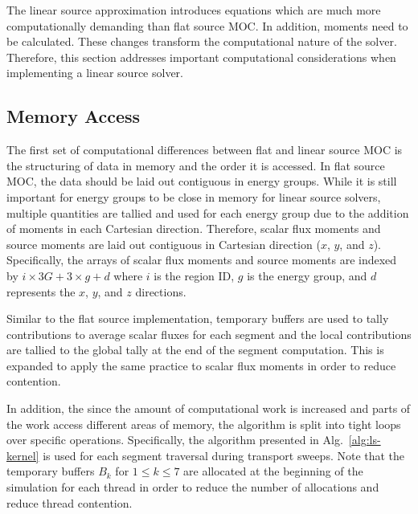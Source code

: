 The linear source approximation introduces equations which are much more computationally demanding than flat source \ac{MOC}. In addition, moments need to be calculated. These changes transform the computational nature of the solver. Therefore, this section addresses important computational considerations when implementing a linear source solver.

\subsection{Memory Access}

The first set of computational differences between flat and linear source \ac{MOC} is the structuring of data in memory and the order it is accessed. In flat source \ac{MOC}, the data should be laid out contiguous in energy groups. While it is still important for energy groups to be close in memory for linear source solvers, multiple quantities are tallied and used for each energy group due to the addition of moments in each Cartesian direction. Therefore, scalar flux moments and source moments are laid out contiguous in Cartesian direction ($x$, $y$, and $z$). Specifically, the arrays of scalar flux moments and source moments are indexed by $i\times 3G + 3\times g + d$ where $i$ is the region ID, $g$ is the energy group, and $d$ represents the $x$, $y$, and $z$ directions.

Similar to the flat source implementation, temporary buffers are used to tally contributions to average scalar fluxes for each segment and the local contributions are tallied to the global tally at the end of the segment computation. This is expanded to apply the same practice to scalar flux moments in order to reduce contention.

In addition, the since the amount of computational work is increased and parts of the work access different areas of memory, the algorithm is split into tight loops over specific operations. Specifically, the algorithm presented in Alg.~\ref{alg:ls-kernel} is used for each segment traversal during transport sweeps. Note that the temporary buffers $B_k$ for $1 \leq k \leq 7$ are allocated at the beginning of the simulation for each thread in order to reduce the number of allocations and reduce thread contention.

